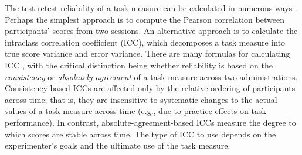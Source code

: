 \documentclass[a4paper,12pt]{article}
\begin{document}
The test-retest reliability of a task measure can be calculated in numerous ways \cite{Parsons2019-jw}. Perhaps the simplest approach is to compute the Pearson correlation between participants' scores from two sessions. An alternative approach is to calculate the intraclass correlation coefficient (ICC), which decomposes a task measure into true score variance and error variance. There are many formulas for calculating ICC \cite{Koo2016-fz}, with the critical distinction being whether reliability is based on the \textit{consistency} or \textit{absolutely agreement} of a task measure across two administrations. Consistency-based ICCs are affected only by the relative ordering of participants across time; that is, they are insensitive to systematic changes to the actual values of a task measure across time (e.g., due to practice effects on task performance). In contrast, absolute-agreement-based ICCs measure the degree to which scores are stable across time. The type of ICC to use depends on the experimenter's goals and the ultimate use of the task measure.
\end{document}
